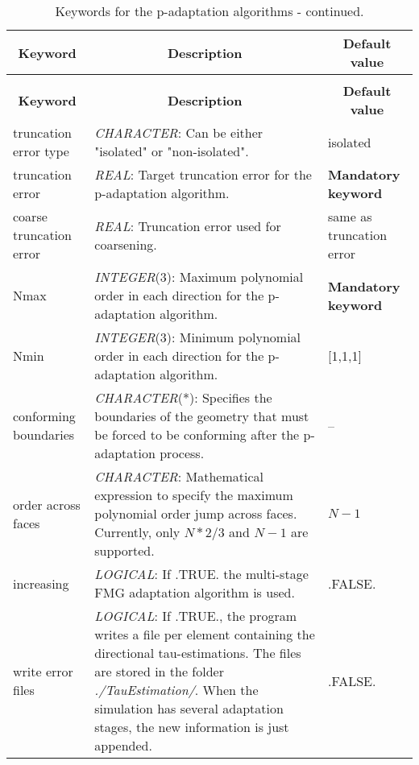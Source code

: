 \documentclass[a4paper,10pt]{report}
\begin{document}
\begin{longtable}{|p{4cm}|p{10cm}|p{2.2cm}|}
\caption{Keywords for the p-adaptation algorithms.} \label{tab:pAdaptationKey} \\
\hline
\multicolumn{1}{|c|}{\textbf{Keyword}} & \multicolumn{1}{c|}{\textbf{Description}} & \multicolumn{1}{c|}{\textbf{Default value}} \\ \hline
\endfirsthead

\caption{Keywords for the p-adaptation algorithms - continued.} \\
\hline
\multicolumn{1}{|c|}{\textbf{Keyword}} & \multicolumn{1}{c|}{\textbf{Description}} & \multicolumn{1}{c|}{\textbf{Default value}} \\ \hline
\endhead

truncation error type & \textit{CHARACTER}: Can be either "isolated" or "non-isolated". & isolated \\ \hline

truncation error & \textit{REAL}: Target truncation error for the p-adaptation algorithm. & \textbf{Mandatory keyword} \\ \hline

coarse truncation error & \textit{REAL}: Truncation error used for coarsening. & same as truncation error \\ \hline

Nmax          & \textit{INTEGER}(3): Maximum polynomial order in each direction for the p-adaptation algorithm. &
					\textbf{Mandatory keyword} \\ \hline

Nmin          & \textit{INTEGER}(3): Minimum polynomial order in each direction for the p-adaptation algorithm. &
					[1,1,1] \\ \hline

conforming boundaries & \textit{CHARACTER}(*): Specifies the boundaries of the geometry that must be forced to be conforming after the p-adaptation process.  	  &
					-- \\ \hline

order across faces &
			\textit{CHARACTER}: Mathematical expression to specify the maximum polynomial order jump across faces. Currently, only $N*2/3$ and $N-1$ are supported. &
					$N-1$ \\ \hline

increasing & \textit{LOGICAL}: If .TRUE. the multi-stage FMG adaptation algorithm is used. &
					.FALSE. \\ \hline

write error files &
			\textit{LOGICAL}: If .TRUE., the program writes a file per element containing the directional tau-estimations. The files are stored in the folder \textit{./TauEstimation/}. When the simulation has several adaptation stages, the new information is just appended. &
			 		.FALSE. \\ \hline


\end{longtable}
\end{document}
